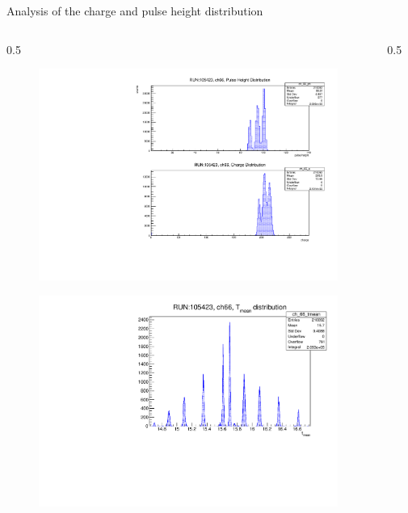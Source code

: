 \documentclass{beamer}[10pt]
\begin{document}
\begin{frame}{Analysis of the charge and pulse height distribution}
\vspace{-2mm}
\begin{columns}
\begin{column}{0.5\framewidth}
\begin{figure}[H]
   \centering
   \includegraphics[width= .85\columnwidth]{figures/pdf/p.pdf}
   \label{fig:wffytl}
 \end{figure}
\vspace{-8mm}
\begin{figure}[H]
   \centering
   \includegraphics[width= .85\columnwidth]{figures/pdf/tmean.pdf}
   \label{fig:wffytl}
 \end{figure}
\end{column}
\begin{column}{0.5\framewidth}
\vspace{-8mm}
\begin{figure}[H]
   \centering

\end{figure}
\end{column}
\end{columns}
\end{frame}
\end{document}
